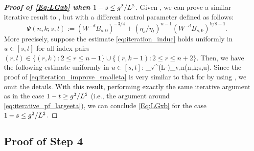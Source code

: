 \begin{proof}[\bf Proof of \eqref{Eq:LGxb} when $1-s\le g^2/L^{2}$]
Given , we can prove a similar iterative result to , but with a different control parameter defined as follows: 
\begin{equation}\label{eq:psipara_smalletacase}
\Psi(n,k;s,t):=  (W^{-d}B_{s,0})^{-3/4}+(\eta_s/\eta_t)^{n-1}(W^{-d}B_{s,0})^{k/8-1}.
\end{equation} 
More precisely, suppose the estimate \eqref{eq:iteration_induc} holds uniformly in $u\in[s,t]$ for all index pairs $(r,l)\in \{(r, k): 2\le r\le n-1\}\cup \{(r, k-1): 2\le r\le n+2\}$. 
Then, we have the following estimate uniformly in $u\in[s,t]$:
\be\label{eq:iteration_improve_smalleta}
    \sup_{v\in[s,u]}\wh \Xi^{({\cal L-\cK})}_{v,n}\prec   \Psi(n,k;s,u).\ee
Since the proof of \eqref{eq:iteration_improve_smalleta} is very similar to that for  by using , we omit the details. 
With this result, performing exactly the same iterative argument as in the case $1-t\ge g^2/L^{2}$ (i.e., the argument around \eqref{eq:iterative_pf_largeeta}), we can conclude \eqref{Eq:LGxb} for the case $1-s\le g^2/L^{2}$.
\end{proof}





\subsection{Proof of Step 4}

